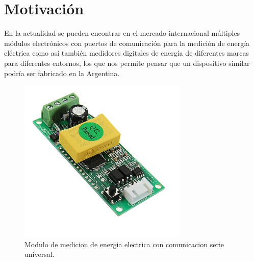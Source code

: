 \section{Motivación}

En la actualidad se pueden encontrar en el mercado internacional múltiples módulos electrónicos con puertos de comunicación para la medición de energía eléctrica como así también medidores digitales de energía de diferentes marcas para diferentes entornos, los que nos permite pensar que un dispositivo similar podría ser fabricado en la Argentina.

\begin{figure}[h]
	\centering
	\includegraphics[width=80mm,keepaspectratio]{Figures/pzeem004.jpg}
	\caption{Modulo de medicion de energia electrica con comunicacion serie universal.}
	\label{fig:texmaker}
\end{figure}







